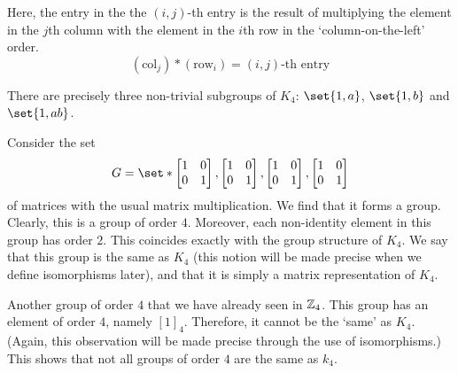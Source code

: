\documentclass[11pt]{penrose}
\begin{document}
Here, the entry in the the $(i,j)$-th entry is the result of multiplying the element in the $j$th column with the element in the $i$th row in the `column-on-the-left' order.
\begin{equation*}
    (\text{col}_j) * (\text{row}_i) = (i,j)\text{-th entry}
\end{equation*}

There are precisely three non-trivial subgroups of $K_4$: $\set{1, a}$, $\set{1, b}$ and $\set{1, ab}$.

Consider the set
\begin{equation}
    G = \set*{
    \begin{bmatrix}1 & 0 \\ 0 & 1\end{bmatrix},
    \begin{bmatrix}1 & 0 \\ 0 & 1\end{bmatrix},
    \begin{bmatrix}1 & 0 \\ 0 & 1\end{bmatrix},
    \begin{bmatrix}1 & 0 \\ 0 & 1\end{bmatrix}}
\end{equation}
of matrices with the usual matrix multiplication. We find that it forms a group. Clearly, this is a group of order $4$. Moreover, each non-identity element in this group has order $2$. This coincides exactly with the group structure of $K_4$. We say that this group is the same as $K_4$ (this notion will be made precise when we define isomorphisms later), and that it is simply a matrix representation of $K_4$.

Another group of order $4$ that we have already seen in $\mathbb{Z}_4$. This group has an element of order $4$, namely $[1]_4$. Therefore, it cannot be the `same' as $K_4$. (Again, this observation will be made precise through the use of isomorphisms.) This shows that not all groups of order $4$ are the same as $k_4$.
\end{document}
